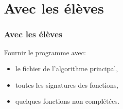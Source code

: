 \documentclass[svgnames,11pt]{beamer}
\begin{document}
\section{Avec les élèves}
\begin{frame}
    \frametitle{Avec les élèves}

    Fournir le programme avec:
        \begin{itemize}
            \item le fichier de l'algorithme principal,
            \item toutes les signatures des fonctions,
            \item quelques fonctions non complétées.
        \end{itemize}

\end{frame}
\end{document}
